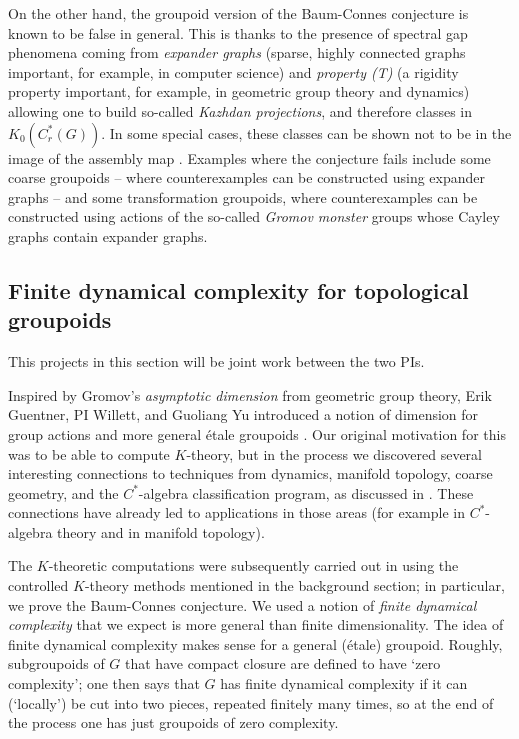 \documentclass[11pt]{article}
\theoremstyle{plain}
\theoremstyle{definition}
\theoremstyle{remark}
\begin{document}
On the other hand, the groupoid version of the Baum-Connes conjecture is known to be false in general.  This is thanks to the presence of spectral gap phenomena coming from \emph{expander graphs} \cite{Lubotzky:1994tw} (sparse, highly connected graphs important, for example, in computer science) and \emph{property (T)} \cite{Bekka:2000kx} (a rigidity property important, for example, in geometric group theory and dynamics) allowing one to build so-called \emph{Kazhdan projections}, and therefore classes in $K_0(C^*_r(G))$.  In some special cases, these classes can be shown not to be in the image of the assembly map \cite{Higson:2002la}.  Examples where the conjecture fails include some coarse groupoids -- where counterexamples can be constructed using expander graphs -- and some transformation groupoids, where counterexamples can be constructed using actions of the so-called \emph{Gromov monster} groups whose Cayley graphs contain expander graphs.  













 
 
 
\subsection{Finite dynamical complexity for topological groupoids}

This projects in this section will be joint work between the two PIs.

Inspired by Gromov's \emph{asymptotic dimension} \cite[Section 1.E]{Gromov:1993tr} from geometric group theory, Erik Guentner, PI Willett, and Guoliang Yu introduced a notion of dimension for group actions and more general \'{e}tale groupoids \cite{Guentner:2014aa}.  Our original motivation for this was to be able to compute $K$-theory, but in the process we discovered several interesting connections to techniques from dynamics, manifold topology, coarse geometry, and the $C^*$-algebra classification program, as discussed in \cite{Guentner:2014aa}.  These connections have already led to applications in those areas (for example \cite{Deeley:2016aa} in $C^*$-algebra theory and \cite{Bartels:2016aa} in manifold topology).  

The $K$-theoretic computations were subsequently carried out in \cite{Guentner:2014bh} using the controlled $K$-theory methods mentioned in the background section; in particular, we prove the Baum-Connes conjecture.  We used a notion of \emph{finite dynamical complexity} that we expect is more general than finite dimensionality.  The idea of finite dynamical complexity makes sense for a general (\'{e}tale) groupoid.  Roughly, subgroupoids of $G$ that have compact closure are defined to have `zero complexity'; one then says that $G$ has finite dynamical complexity if it can (`locally') be cut into two pieces, repeated finitely many times, so at the end of the process one has just groupoids of zero complexity.
\end{document}

